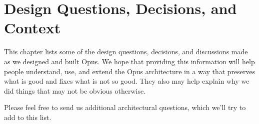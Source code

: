 

\chapter{Design Questions, Decisions, and Context}

This chapter lists some of the design questions, decisions, and discussions
made as we designed and built Opus.  We hope that providing this information
will help people understand, use, and extend the Opus architecture in a way
that preserves what is good and fixes what is not so good.  They also may help
explain why we did things that may not be obvious otherwise.

Please feel free to send us additional architectural questions, which we'll try
to add to this list.

\newenvironment{design-question}{
\begin{flushright}
\begin{tabular}{|p{0.9\linewidth}|}\hline\emph{Guideline:}
} { \\ \hline
\end{tabular}
\end{flushright}
}

